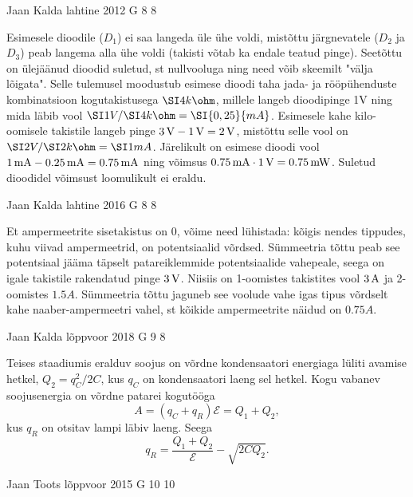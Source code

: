 \documentclass[11pt]{article}
\begin{document}
{%
{Jaan Kalda} %
{lahtine} %
{2012} %
{G 8} %
{8} %
{

\ifSolution
Esimesele dioodile ($D_1$) ei saa langeda üle ühe voldi, mistõttu järgnevatele ($D_2$ ja $D_3$) peab langema alla ühe voldi (takisti võtab ka endale teatud pinge).
Seetõttu on ülejäänud dioodid suletud, st nullvooluga ning need võib skeemilt "välja lõigata". Selle tulemusel moodustub esimese dioodi taha 
jada- ja rööpühenduste kombinatsioon kogutakistusega $\SI 4{k\ohm}$, millele langeb dioodipinge 1V ning mida läbib vool $\SI 1V /\SI 4{k\ohm}= \SI {0,25}{mA}$. 
Esimesele kahe kilo-oomisele takistile langeb pinge $\SI 3V-\SI 1V=\SI 2V$, mistõttu selle vool on $\SI 2V/\SI 2{k\ohm}=\SI 1{mA}$. Järelikult on esimese dioodi vool
$\SI 1{mA}-\SI {0,25}{mA}=\SI{0,75}{mA}$ ning võimsus $\SI{0,75}{mA}\cdot \SI 1V=\SI{0,75}{mW}$. Suletud dioodidel võimsust loomulikult ei eraldu.
\fi
}

{Jaan Kalda} %
{lahtine} %
{2016} %
{G 8} %
{8} %
{

\ifSolution
Et ampermeetrite sisetakistus on \num{0}, võime need lühistada: kõigis nendes tippudes, kuhu viivad ampermeetrid, on potentsiaalid võrdsed. Sümmeetria tõttu peab see 
potentsiaal jääma täpselt patareiklemmide potentsiaalide vahepeale, seega on igale takistile rakendatud pinge
$\SI 3V$. Niisiis on 1-oomistes takistites vool $\SI 3A$ ja 2-oomistes $\SI {1.5}A$. Sümmeetria tõttu 
jaguneb see voolude vahe igas tipus võrdselt kahe naaber-ampermeetri vahel, st kõikide ampermeetrite näidud on 
$\SI {0.75}A$.
\fi
}

{Jaan Kalda} %
{lõppvoor} %
{2018} %
{G 9} %
{8} %
{

\ifSolution
Teises staadiumis eralduv soojus on võrdne kondensaatori energiaga lüliti avamise hetkel, $Q_2=q_C^2/2C$, kus $q_C$ on kondensaatori laeng sel hetkel. Kogu vabanev soojusenergia on võrdne patarei kogutööga
\[
A=(q_C+q_R)\mathcal E=Q_1+Q_2,
\]
kus $q_R$ on otsitav lampi läbiv laeng. Seega
\[
q_R=\frac{Q_1+Q_2}{\mathcal E}-\sqrt{2CQ_2}.
\]
\fi
}

{Jaan Toots} %
{lõppvoor} %
{2015} %
{G 10} %
{10} %
{

}}
\end{document}
